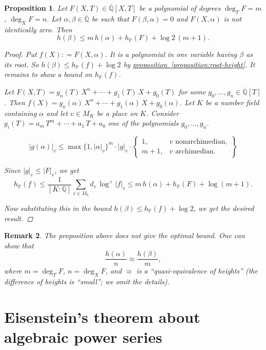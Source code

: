 \documentclass{article}
\newcommand{\dfn}{\mathrel{\mathop:}=}
\newcommand{\QQ}{\mathbb{Q}}
\newcommand{\refref}[2]{\hyperref[#2]{#1~\ref*{#2}}}
\theoremstyle{myplain}
\newtheorem{proposition}{Proposition}[section]
\theoremstyle{mydefinition}
\newtheorem{remark}[proposition]{Remark}
\begin{document}
\begin{proposition}\label{proposition:beta-alpha-roots-height}
  Let $F (X,T) \in \overline{\QQ} [X,T]$ be a polynomial of degrees
  $\deg_T F = m$, $\deg_X F = n$. Let $\alpha, \beta \in \overline{\QQ}$ be such
  that $F (\beta,\alpha) = 0$ and $F (X, \alpha)$ is not identically zero. Then
  \[ h (\beta) \le m \, h (\alpha) + h_\mathbb{P} (F) + \log 2 \, (m+1). \]

  \begin{proof}
    Put $f (X) \dfn F (X, \alpha)$. It is a polynomial in one variable having
    $\beta$ as its root. So $h (\beta) \le h_\mathbb{P} (f) + \log 2$ by
    \refref{proposition}{proposition:root-height}. It remains to show a bound on
    $h_\mathbb{P} (f)$.

    Let $F (X,T) = g_n (T)\,X^n + \cdots + g_1 (T)\,X + g_0 (T)$ for some
    $g_0, \ldots, g_n \in \overline{\QQ} [T]$. Then
    $f (X) = g_n (\alpha)\,X^n + \cdots + g_1 (\alpha)\,X + g_0 (\alpha)$. Let
    $K$ be a number field containing $\alpha$ and let $v \in M_K$ be a place on
    $K$. Consider $g_i (T) = a_m\,T^m + \cdots + a_1\,T + a_0$ one of the
    polynomials $g_0, \ldots, g_n$.

    \[ |g (\alpha)|_v \le \max \{ 1, |\alpha|_v \}^m \cdot |g|_v \cdot
      \left\{\begin{array}{ll}
               1, & v \text{ nonarchimedian}, \\
               m+1, & v \text{ archimedian}.
             \end{array}\right\} \]

    Since $|g|_v \le |F|_v$, we get
    \[ h_\mathbb{P} (f) \le
      \frac{1}{[K : \QQ]} \sum_{v \in M_k} d_v \, \log^+ |f|_v \le
      m \, h (\alpha) + h_\mathbb{P} (F) + \log (m+1). \]

    Now substituting this in the bound
    $h (\beta) \le h_\mathbb{P} (f) + \log 2$, we get the desired result.
  \end{proof}
\end{proposition}

\begin{remark}
  The proposition above does not give the optimal bound. One can show that
  $$\frac{h (\alpha)}{n} \approx \frac{h (\beta)}{m},$$
  where $m = \deg_T F$, $n = \deg_X F$, and $\approx$ is a ``quasi-equivalence
  of heights'' (the difference of heights is ``small''; we omit the details).
\end{remark}

\section{Eisenstein's theorem about algebraic power series}
\end{document}
